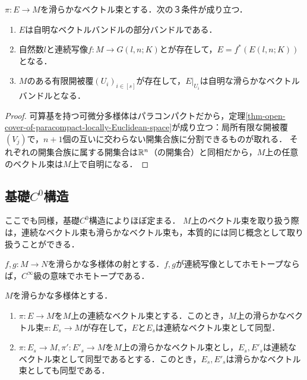 \documentclass[uplatex,dvipdfmx]{jsreport}
\begin{document}
\begin{theorem}
    $\pi:E\to M$を滑らかなベクトル束とする．次の３条件が成り立つ．
    \begin{enumerate}
        \item $E$は自明なベクトルバンドルの部分バンドルである．
        \item 自然数$l$と連続写像$f:M\to G(l,n;K)$とが存在して，$E=f^*(E(l,n;K))$となる．
        \item $M$のある有限開被覆$(U_i)_{i\in[s]}$が存在して，$E|_{U_i}$は自明な滑らかなベクトルバンドルとなる．
    \end{enumerate}
\end{theorem}
\begin{proof}
    可算基を持つ可微分多様体はパラコンパクトだから，定理\ref{thm-open-cover-of-paracompact-locally-Euclidean-space}が成り立つ：局所有限な開被覆$(V_j)$で，$n+1$個の互いに交わらない開集合族に分割できるものが取れる．
    それぞれの開集合族に属する開集合は$\mathbb{R}^n$（の開集合）と同相だから，$M$上の任意のベクトル束は$M$上で自明になる．
\end{proof}

\subsection{基礎$C^0$構造}

\begin{tcolorbox}[colframe=ForestGreen, colback=ForestGreen!10!white,breakable,colbacktitle=ForestGreen!40!white,coltitle=black,fonttitle=\bfseries\sffamily,
title=]
    ここでも同様，基礎$C^0$構造によりほぼ定まる．
    $M$上のベクトル束を取り扱う際は，連続なベクトル束も滑らかなベクトル束も，本質的には同じ概念として取り扱うことができる．
\end{tcolorbox}

\begin{lemma}
    $f,g:M\to N$を滑らかな多様体の射とする．$f,g$が連続写像としてホモトープならば，$C^\infty$級の意味でホモトープである．
\end{lemma}

\begin{theorem}
    $M$を滑らかな多様体とする．
    \begin{enumerate}
        \item $\pi:E\to M$を$M$上の連続なベクトル束とする．このとき，$M$上の滑らかなベクトル束$\pi:E_s\to M$が存在して，$E$と$E_s$は連続なベクトル束として同型．
        \item $\pi:E_s\to M,\pi':E'_s\to M$を$M$上の滑らかなベクトル束とし，$E_s,E'_s$は連続なベクトル束として同型であるとする．このとき，$E_s,E'_s$は滑らかなベクトル束としても同型である．
    \end{enumerate}
\end{theorem}
\end{document}
